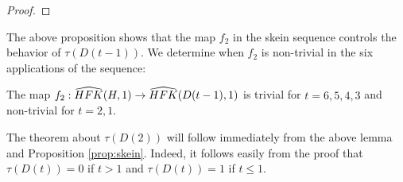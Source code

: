 \begin{proof}

\end{proof}




The above proposition shows that the map $f_2$ in the skein sequence controls the behavior of $\tau(D(t-1))$.  We determine when $f_2$ is non-trivial in the six applications of the sequence:  

\begin{lemma}
	\label{lemma:lemma1}
The map	$ f_2:\widehat{HFK}(H,1)\rightarrow \widehat{HFK}(D(t-1),1)$ is trivial for $t=6,5,4,3$ and non-trivial for $t=2,1$.
\end{lemma}

The theorem about $\tau(D(2))$ will follow immediately from the above lemma and Proposition \ref{prop:skein}.  Indeed, it follows easily from the proof that $\tau(D(t))=0$ if $t>1$ and  $\tau(D(t))=1$ if $t\le 1$.  

